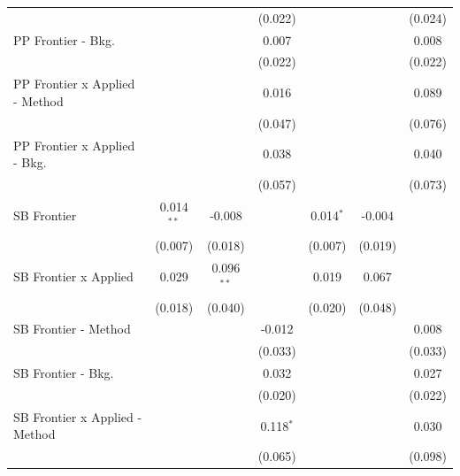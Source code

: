 \begin{tabular}{lcccccc}
                                  &              &              & (0.022)       &              &         & (0.024)\\   
   PP Frontier - Bkg.             &              &              & 0.007         &              &         & 0.008\\   
                                  &              &              & (0.022)       &              &         & (0.022)\\   
   PP Frontier x Applied - Method &              &              & 0.016         &              &         & 0.089\\   
                                  &              &              & (0.047)       &              &         & (0.076)\\   
   PP Frontier x Applied - Bkg.   &              &              & 0.038         &              &         & 0.040\\   
                                  &              &              & (0.057)       &              &         & (0.073)\\   
   SB Frontier                    & 0.014$^{**}$ & -0.008       &               & 0.014$^{*}$  & -0.004  &   \\   
                                  & (0.007)      & (0.018)      &               & (0.007)      & (0.019) &   \\   
   SB Frontier x Applied          & 0.029        & 0.096$^{**}$ &               & 0.019        & 0.067   &   \\   
                                  & (0.018)      & (0.040)      &               & (0.020)      & (0.048) &   \\   
   SB Frontier - Method           &              &              & -0.012        &              &         & 0.008\\   
                                  &              &              & (0.033)       &              &         & (0.033)\\   
   SB Frontier - Bkg.             &              &              & 0.032         &              &         & 0.027\\   
                                  &              &              & (0.020)       &              &         & (0.022)\\   
   SB Frontier x Applied - Method &              &              & 0.118$^{*}$   &              &         & 0.030\\   
                                  &              &              & (0.065)       &              &         & (0.098)\\   

\end{tabular}
